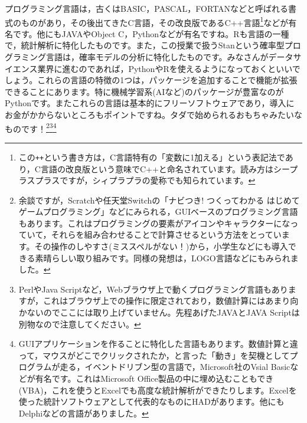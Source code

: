\documentclass{ltjsbook}
\begin{document}
プログラミング言語は，古くはBASIC，PASCAL，FORTANなどと呼ばれる書式のものがあり，その後出てきたC言語，その改良版であるC++言語\footnote{この\verb|++|という書き方は，C言語特有の「変数に1加える」という表記法であり，C言語の改良版という意味でC++と命名されています。読み方はシープラスプラスですが，シィプラプラの愛称でも知られています。}などが有名です。他にもJAVAやObject C，Pythonなどが有名ですね。Rも言語の一種で，統計解析に特化したものです。また，この授業で扱うStanという確率型プログラミング言語は，確率モデルの分析に特化したものです。みなさんがデータサイエンス業界に進むのであれば，PythonやRを使えるようになっておくといいでしょう。これらの言語の特徴の1つは，パッケージを追加することで機能が拡張できることにあります。特に機械学習系(AIなど)のパッケージが豊富なのがPythonです。またこれらの言語は基本的にフリーソフトウェアであり，導入にお金がかからないところもポイントですね。タダで始められるおもちゃみたいなものです！\footnote{余談ですが，Scratchや任天堂Switchの「ナビつき! つくってわかる はじめてゲームプログラミング」などにみられる，GUIベースのプログラミング言語もあります。これはプログラミングの要素がアイコンやキャラクターになっていて，それらを組み合わせることで計算させるという方法をとっています。その操作のしやすさ(ミススペルがない！)から，小学生などにも導入できる素晴らしい取り組みです。同様の発想は，LOGO言語などにもみられました。}\footnote{PerlやJava Scriptなど，Webブラウザ上で動くプログラミング言語もありますが，これはブラウザ上での操作に限定されており，数値計算にはあまり向かないのでここには取り上げていません。先程あげたJAVAとJAVA Scriptは別物なので注意してください。}\footnote{GUIアプリケーションを作ることに特化した言語もあります。数値計算と違って，マウスがどこでクリックされたか，と言った「動き」を契機としてプログラムが走る，イベントドリブン型の言語で，Microsoft社のVsial Basicなどが有名です。これはMicrosoft Office製品の中に埋め込むこともでき(VBA)，これを使うとExcelでも高度な統計解析ができたりします。Excelを使った統計ソフトウェアとして代表的なものにHADがあります\citep{HAD}。他にもDelphiなどの言語がありました。}
\end{document}
